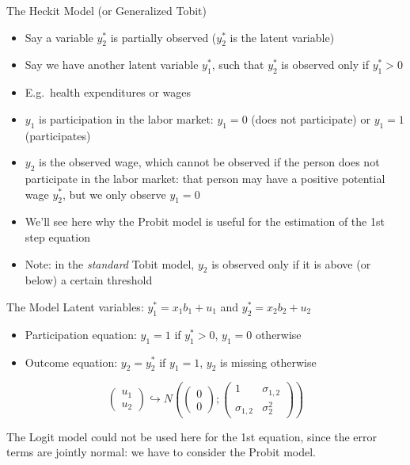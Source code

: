 \documentclass[aspectratio=169]{beamer}
\begin{document}
\begin{frame}{The Heckit Model (or Generalized Tobit)}
\begin{itemize}
    \item Say a variable $y_2^*$ is partially observed ($y_2^*$ is the latent variable)
    \item Say we have another latent variable $y_1^*$, such that $y_2^*$ is observed only if $y_1^* > 0$
    \item E.g.\ health expenditures or wages
    \item $y_1$ is participation in the labor market: $y_1 = 0$ (does not participate) or $y_1 = 1$ (participates)
    \item $y_2$ is the observed wage, which cannot be observed if the person does not participate in the labor market: that person may have a positive potential wage $y_2^*$, but we only observe $y_1 = 0$
    \item We'll see here why the Probit model is useful for the estimation of the 1st step equation
    \item Note: in the \textit{standard} Tobit model, $y_2$ is observed only if it is above (or below) a certain threshold
\end{itemize}
\end{frame}

\begin{frame}{The Model}
Latent variables: $y_1^* = x_1b_1 + u_1$ and $y_2^* = x_2b_2 + u_2$

\begin{itemize}
    \item Participation equation: $y_1 = 1$ if $y_1^* > 0$, $y_1 = 0$ otherwise
    \item Outcome equation: $y_2 = y_2^*$ if $y_1 = 1$, $y_2$ is missing otherwise
\end{itemize}

\[\begin{pmatrix} u_1 \\ u_2 \end{pmatrix} \hookrightarrow N\left(\begin{pmatrix} 0 \\ 0 \end{pmatrix}; \begin{pmatrix} 1 & \sigma_{1,2} \\ \sigma_{1,2} & \sigma_2^2 \end{pmatrix}\right)\]

The Logit model could not be used here for the 1st equation, since the error terms are jointly normal: we have to consider the Probit model.
\end{frame}
\end{document}
